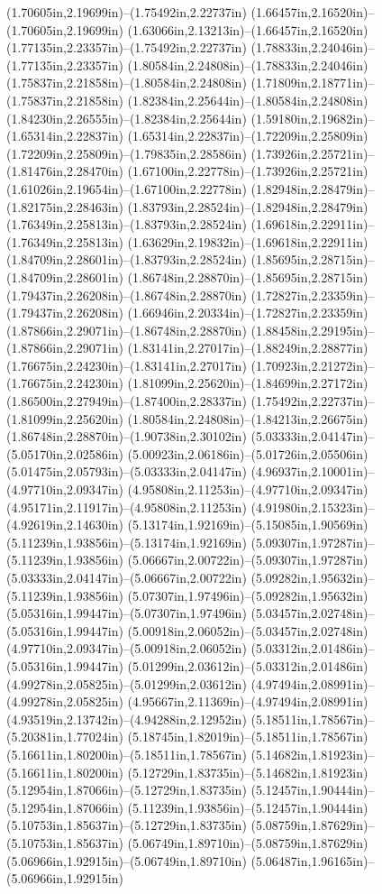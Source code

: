 (1.70605in,2.19699in)--(1.75492in,2.22737in) (1.66457in,2.16520in)--(1.70605in,2.19699in) (1.63066in,2.13213in)--(1.66457in,2.16520in) (1.77135in,2.23357in)--(1.75492in,2.22737in) (1.78833in,2.24046in)--(1.77135in,2.23357in) (1.80584in,2.24808in)--(1.78833in,2.24046in) (1.75837in,2.21858in)--(1.80584in,2.24808in) (1.71809in,2.18771in)--(1.75837in,2.21858in) (1.82384in,2.25644in)--(1.80584in,2.24808in) (1.84230in,2.26555in)--(1.82384in,2.25644in) (1.59180in,2.19682in)--(1.65314in,2.22837in) (1.65314in,2.22837in)--(1.72209in,2.25809in) (1.72209in,2.25809in)--(1.79835in,2.28586in) (1.73926in,2.25721in)--(1.81476in,2.28470in) (1.67100in,2.22778in)--(1.73926in,2.25721in) (1.61026in,2.19654in)--(1.67100in,2.22778in) (1.82948in,2.28479in)--(1.82175in,2.28463in) (1.83793in,2.28524in)--(1.82948in,2.28479in) (1.76349in,2.25813in)--(1.83793in,2.28524in) (1.69618in,2.22911in)--(1.76349in,2.25813in) (1.63629in,2.19832in)--(1.69618in,2.22911in) (1.84709in,2.28601in)--(1.83793in,2.28524in) (1.85695in,2.28715in)--(1.84709in,2.28601in) (1.86748in,2.28870in)--(1.85695in,2.28715in) (1.79437in,2.26208in)--(1.86748in,2.28870in) (1.72827in,2.23359in)--(1.79437in,2.26208in) (1.66946in,2.20334in)--(1.72827in,2.23359in) (1.87866in,2.29071in)--(1.86748in,2.28870in) (1.88458in,2.29195in)--(1.87866in,2.29071in) (1.83141in,2.27017in)--(1.88249in,2.28877in) (1.76675in,2.24230in)--(1.83141in,2.27017in) (1.70923in,2.21272in)--(1.76675in,2.24230in) (1.81099in,2.25620in)--(1.84699in,2.27172in) (1.86500in,2.27949in)--(1.87400in,2.28337in) (1.75492in,2.22737in)--(1.81099in,2.25620in) (1.80584in,2.24808in)--(1.84213in,2.26675in) (1.86748in,2.28870in)--(1.90738in,2.30102in) (5.03333in,2.04147in)--(5.05170in,2.02586in) (5.00923in,2.06186in)--(5.01726in,2.05506in) (5.01475in,2.05793in)--(5.03333in,2.04147in) (4.96937in,2.10001in)--(4.97710in,2.09347in) (4.95808in,2.11253in)--(4.97710in,2.09347in) (4.95171in,2.11917in)--(4.95808in,2.11253in) (4.91980in,2.15323in)--(4.92619in,2.14630in) (5.13174in,1.92169in)--(5.15085in,1.90569in) (5.11239in,1.93856in)--(5.13174in,1.92169in) (5.09307in,1.97287in)--(5.11239in,1.93856in) (5.06667in,2.00722in)--(5.09307in,1.97287in) (5.03333in,2.04147in)--(5.06667in,2.00722in) (5.09282in,1.95632in)--(5.11239in,1.93856in) (5.07307in,1.97496in)--(5.09282in,1.95632in) (5.05316in,1.99447in)--(5.07307in,1.97496in) (5.03457in,2.02748in)--(5.05316in,1.99447in) (5.00918in,2.06052in)--(5.03457in,2.02748in) (4.97710in,2.09347in)--(5.00918in,2.06052in) (5.03312in,2.01486in)--(5.05316in,1.99447in) (5.01299in,2.03612in)--(5.03312in,2.01486in) (4.99278in,2.05825in)--(5.01299in,2.03612in) (4.97494in,2.08991in)--(4.99278in,2.05825in) (4.95667in,2.11369in)--(4.97494in,2.08991in) (4.93519in,2.13742in)--(4.94288in,2.12952in) (5.18511in,1.78567in)--(5.20381in,1.77024in) (5.18745in,1.82019in)--(5.18511in,1.78567in) (5.16611in,1.80200in)--(5.18511in,1.78567in) (5.14682in,1.81923in)--(5.16611in,1.80200in) (5.12729in,1.83735in)--(5.14682in,1.81923in) (5.12954in,1.87066in)--(5.12729in,1.83735in) (5.12457in,1.90444in)--(5.12954in,1.87066in) (5.11239in,1.93856in)--(5.12457in,1.90444in) (5.10753in,1.85637in)--(5.12729in,1.83735in) (5.08759in,1.87629in)--(5.10753in,1.85637in) (5.06749in,1.89710in)--(5.08759in,1.87629in) (5.06966in,1.92915in)--(5.06749in,1.89710in) (5.06487in,1.96165in)--(5.06966in,1.92915in) 